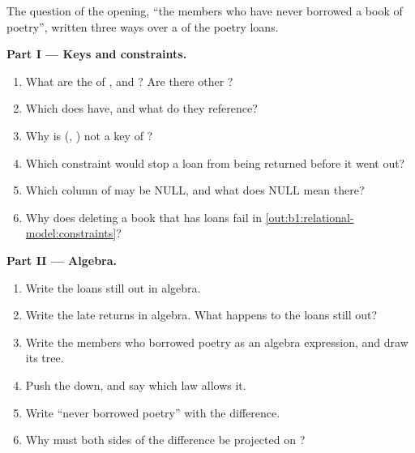 \begin{problem}\label{pb:b1:relational-model:1}
The question of the opening, ``the members who have never borrowed a book of poetry'', written three ways over a 
of the poetry loans.
\label{lst:b1:relational-model:never}
\label{out:b1:relational-model:never}

\medskip\noindent\textbf{Part I --- Keys and constraints.}
\begin{enumerate}
\item What are the  of ,  and ? Are there other ?
\item Which  does  have, and what do they reference?
\item Why is (, ) not a key of ?
\item Which constraint would stop a loan from being returned before it went out?
\item Which column of  may be NULL, and what does NULL mean there?
\item Why does deleting a book that has loans fail in \cref{out:b1:relational-model:constraints}?
\end{enumerate}

\medskip\noindent\textbf{Part II --- Algebra.}
\begin{enumerate}[resume]
\item Write the loans still out in algebra.
\item Write the late returns in algebra. What happens to the loans still out?
\item Write the members who borrowed poetry as an algebra expression, and draw its tree.
\item Push the  down, and say which law allows it.
\item Write ``never borrowed poetry'' with the difference.
\item Why must both sides of the difference be projected on ?
\end{enumerate}


\end{problem}
